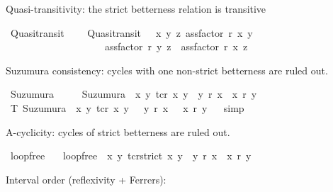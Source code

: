 \begin{isabellebody}
\begin{isamarkuptext}%
Quasi-transitivity: the strict betterness relation is transitive%
\end{isamarkuptext}\isamarkuptrue%
\isamarkupfalse%
\ Quasitransit\ \isanewline
\ \ \ {\isachardoublequoteopen}Quasitransit\ \ {\isasymequiv}\ {\isasymforall}x\ y\ z{\isachardot}{\kern0pt}\ {\isacharparenleft}{\kern0pt}assfactor\ r\ x\ y\ {\isasymand}\ \ \isanewline
\ \ \ \ \ \ \ \ \ \ \ \ \ \ \ \ \ \ \ \ assfactor\ r\ y\ z{\isacharparenright}{\kern0pt}\ {\isasymlongrightarrow}\ assfactor\ r\ x\ z{\isachardoublequoteclose}%
\begin{isamarkuptext}%
Suzumura consistency: cycles with one non-strict betterness are ruled out.%
\end{isamarkuptext}\isamarkuptrue%
\isamarkupfalse%
\ Suzumura\ \ \isanewline
\ \ \ {\isachardoublequoteopen}Suzumura\ {\isasymequiv}\ {\isasymforall}x\ y{\isachardot}{\kern0pt}\ tcr\ x\ y\ {\isasymlongrightarrow}\ {\isacharparenleft}{\kern0pt}y\ \isactrlbold r\ x\ {\isasymlongrightarrow}\ x\ \isactrlbold r\ y{\isacharparenright}{\kern0pt}{\isachardoublequoteclose}\isanewline
\isanewline
{}\isamarkupfalse%
\ T{}{\isacharcolon}{\kern0pt}\ {\isachardoublequoteopen}Suzumura\ {\isasymequiv}\ {\isasymforall}x\ y{\isachardot}{\kern0pt}\ tcr\ x\ y\ {\isasymlongrightarrow}\ {\isasymnot}\ {\isacharparenleft}{\kern0pt}y\ \isactrlbold r\ x\ {\isasymand}\ {\isasymnot}\ {\isacharparenleft}{\kern0pt}x\ \isactrlbold r\ y{\isacharparenright}{\kern0pt}{\isacharparenright}{\kern0pt}{\isachardoublequoteclose}%
\isadelimproof
\ %
\endisadelimproof
%
\isatagproof
{}\isamarkupfalse%
\ simp%
\endisatagproof
{\isafoldproof}%
%
\isadelimproof
%
\endisadelimproof
%
\begin{isamarkuptext}%
A-cyclicity: cycles of strict betterness are ruled out.%
\end{isamarkuptext}\isamarkuptrue%
\isamarkupfalse%
\ loopfree\isanewline
\ \ \ {\isachardoublequoteopen}loopfree\ {\isasymequiv}\ {\isasymforall}x\ y{\isachardot}{\kern0pt}\ tcr{\isacharunderscore}{\kern0pt}strict\ x\ y\ {\isasymlongrightarrow}\ {\isacharparenleft}{\kern0pt}y\ \isactrlbold r\ x\ {\isasymlongrightarrow}\ x\ \isactrlbold r\ y{\isacharparenright}{\kern0pt}{\isachardoublequoteclose}%
\begin{isamarkuptext}%
Interval order (reflexivity + Ferrers):%
\end{isamarkuptext}\isamarkuptrue%

\end{isabellebody}
